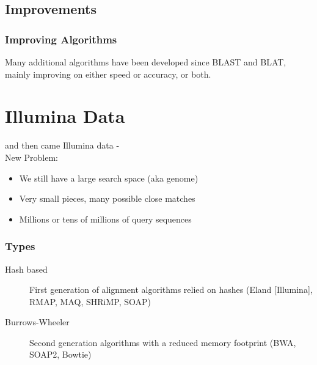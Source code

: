 \documentclass[pdf]{beamer}
\begin{document}
\subsection{Improvements}
\begin{frame}
  \frametitle{Improving Algorithms}
  Many additional algorithms have been developed since BLAST and BLAT, mainly improving on either speed or accuracy, or both.
\end{frame}

\section{Illumina Data}
\begin{frame}
and then came Illumina data -\\
New Problem:\\
\begin{itemize}
\item We still have a large search space (aka genome)
\item Very small pieces, many possible close matches
\item Millions or tens of millions of query sequences
\end{itemize}
\end{frame}

\begin{frame}
  \frametitle{Types}
  \begin{description}
  \item[Hash based] First generation of alignment algorithms relied on hashes (Eland [Illumina], RMAP, MAQ, SHRiMP, SOAP)
  \item [Burrows-Wheeler] Second generation algorithms with a reduced memory footprint (BWA, SOAP2, Bowtie)
  \end{description}
\end{frame}
\end{document}
